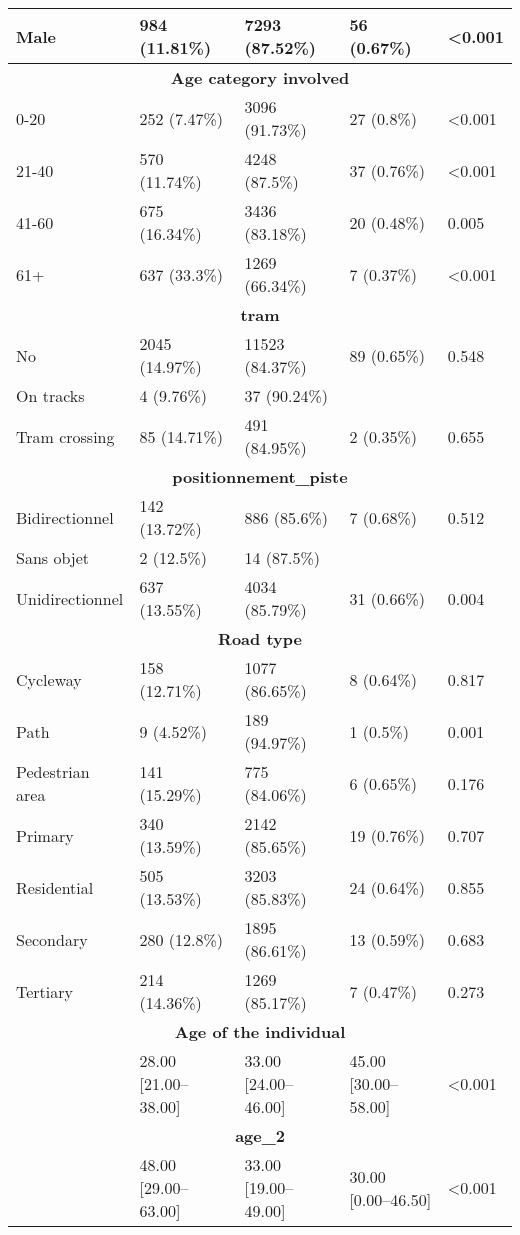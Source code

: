 \begin{longtable}{p{4.5cm}p{3cm}p{3cm}p{3cm}p{1.5cm}}
Male & 984 (11.81\%) & 7293 (87.52\%) & 56 (0.67\%) & <0.001  \\
\hline
\multicolumn{5}{c}{\textbf{Age category involved}} \\
0-20 & 252 (7.47\%) & 3096 (91.73\%) & 27 (0.8\%) & <0.001  \\
21-40 & 570 (11.74\%) & 4248 (87.5\%) & 37 (0.76\%) & <0.001  \\
41-60 & 675 (16.34\%) & 3436 (83.18\%) & 20 (0.48\%) & 0.005  \\
61+ & 637 (33.3\%) & 1269 (66.34\%) & 7 (0.37\%) & <0.001  \\
\hline
\multicolumn{5}{c}{\textbf{tram}} \\
No & 2045 (14.97\%) & 11523 (84.37\%) & 89 (0.65\%) & 0.548  \\
On tracks & 4 (9.76\%) & 37 (90.24\%) &  &   \\
Tram crossing & 85 (14.71\%) & 491 (84.95\%) & 2 (0.35\%) & 0.655  \\
\hline
\multicolumn{5}{c}{\textbf{positionnement\_piste}} \\
Bidirectionnel & 142 (13.72\%) & 886 (85.6\%) & 7 (0.68\%) & 0.512  \\
Sans objet & 2 (12.5\%) & 14 (87.5\%) &  &   \\
Unidirectionnel & 637 (13.55\%) & 4034 (85.79\%) & 31 (0.66\%) & 0.004  \\
\hline
\multicolumn{5}{c}{\textbf{Road type}} \\
Cycleway & 158 (12.71\%) & 1077 (86.65\%) & 8 (0.64\%) & 0.817  \\
Path & 9 (4.52\%) & 189 (94.97\%) & 1 (0.5\%) & 0.001  \\
Pedestrian area & 141 (15.29\%) & 775 (84.06\%) & 6 (0.65\%) & 0.176  \\
Primary & 340 (13.59\%) & 2142 (85.65\%) & 19 (0.76\%) & 0.707  \\
Residential & 505 (13.53\%) & 3203 (85.83\%) & 24 (0.64\%) & 0.855  \\
Secondary & 280 (12.8\%) & 1895 (86.61\%) & 13 (0.59\%) & 0.683  \\
Tertiary & 214 (14.36\%) & 1269 (85.17\%) & 7 (0.47\%) & 0.273  \\
\hline
\multicolumn{5}{c}{\textbf{Age of the individual}} \\
 & 28.00 [21.00–38.00] & 33.00 [24.00–46.00] & 45.00 [30.00–58.00] & <0.001  \\
\hline
\multicolumn{5}{c}{\textbf{age\_2}} \\
 & 48.00 [29.00–63.00] & 33.00 [19.00–49.00] & 30.00 [0.00–46.50] & <0.001  \\

\end{longtable}

